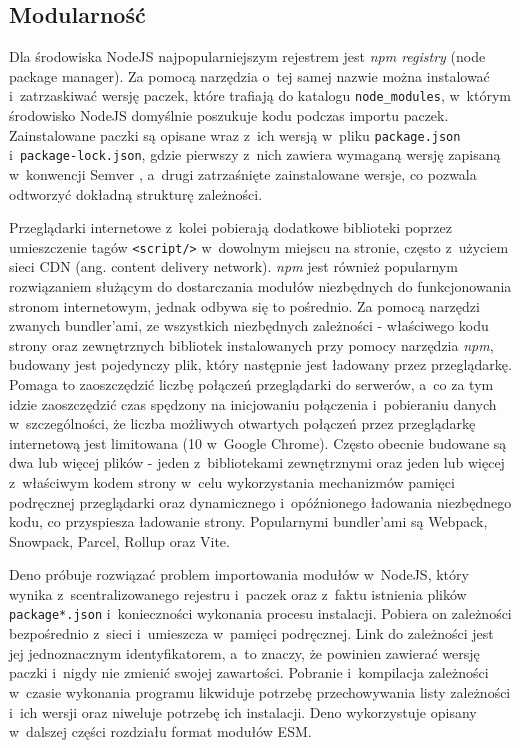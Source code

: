 \subsection{Modularność}

Dla środowiska NodeJS najpopularniejszym rejestrem jest \textit{npm registry} (node package manager). Za pomocą narzędzia o~tej samej nazwie można instalować i~zatrzaskiwać wersję paczek, które trafiają do katalogu \lstinline{node_modules}, w~którym środowisko NodeJS domyślnie poszukuje kodu podczas importu paczek. Zainstalowane paczki są opisane wraz z~ich wersją w~pliku \mbox{\lstinline{package.json}} i~\lstinline{package-lock.json}, gdzie pierwszy z~nich zawiera wymaganą wersję zapisaną w~konwencji Semver \cite{semver}, a~drugi zatrzaśnięte zainstalowane wersje, co pozwala odtworzyć dokładną strukturę zależności.

Przeglądarki internetowe z~kolei pobierają dodatkowe biblioteki poprzez umieszczenie tagów \lstinline{<script/>} w~dowolnym miejscu na stronie, często z~użyciem sieci CDN (ang. content delivery network). \textit{npm} jest również popularnym rozwiązaniem służącym do dostarczania modułów niezbędnych do funkcjonowania stronom internetowym, jednak odbywa się to pośrednio. Za pomocą narzędzi zwanych bundler'ami, ze wszystkich niezbędnych zależności - właściwego kodu strony oraz zewnętrznych bibliotek instalowanych przy pomocy narzędzia \textit{npm}, budowany jest pojedynczy plik, który następnie jest ładowany przez przeglądarkę. Pomaga to zaoszczędzić liczbę połączeń przeglądarki do serwerów, a~co za tym idzie zaoszczędzić czas spędzony na inicjowaniu połączenia i~pobieraniu danych w~szczególności, że liczba możliwych otwartych połączeń przez przeglądarkę internetową jest limitowana (10 w~Google Chrome). Często obecnie budowane są dwa lub więcej plików - jeden z~bibliotekami zewnętrznymi oraz jeden lub więcej z~właściwym kodem strony w~celu wykorzystania mechanizmów pamięci podręcznej przeglądarki oraz dynamicznego i~opóźnionego ładowania niezbędnego kodu, co przyspiesza ładowanie strony. Popularnymi bundler'ami są Webpack, Snowpack, Parcel, Rollup oraz Vite.

Deno próbuje rozwiązać problem importowania modułów w~NodeJS, który wynika z~scentralizowanego rejestru i~paczek oraz z~faktu istnienia plików \lstinline{package*.json} i~konieczności wykonania procesu instalacji. Pobiera on zależności bezpośrednio z~sieci i~umieszcza w~pamięci podręcznej. Link do zależności jest jej jednoznacznym identyfikatorem, a~to znaczy, że powinien zawierać wersję paczki i~nigdy nie zmienić swojej zawartości. Pobranie i~kompilacja zależności w~czasie wykonania programu likwiduje potrzebę przechowywania listy zależności i~ich wersji oraz niweluje potrzebę ich instalacji. Deno wykorzystuje opisany w~dalszej części rozdziału format modułów ESM.

